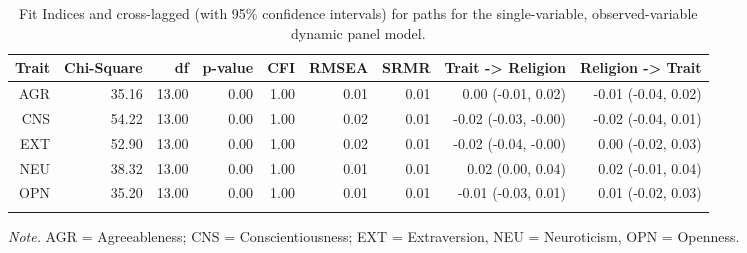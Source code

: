 \documentclass[
  man,floatsintext]{apa6}
\begin{document}
\begin{table}[h]

\begin{center}
\begin{threeparttable}

\caption{\label{tab:dpmResults}Fit Indices and cross-lagged (with 95\% confidence intervals) for paths for the single-variable, observed-variable dynamic panel model.}

\begin{tabular}{rrrrrrrrr}
\toprule
Trait & Chi-Square & df & p-value & CFI & RMSEA & SRMR & Trait -> Religion & Religion -> Trait\\
\midrule
AGR & 35.16 & 13.00 & 0.00 & 1.00 & 0.01 & 0.01 & 0.00 (-0.01, 0.02) & -0.01 (-0.04, 0.02)\\
CNS & 54.22 & 13.00 & 0.00 & 1.00 & 0.02 & 0.01 & -0.02 (-0.03, -0.00) & -0.02 (-0.04, 0.01)\\
EXT & 52.90 & 13.00 & 0.00 & 1.00 & 0.02 & 0.01 & -0.02 (-0.04, -0.00) & 0.00 (-0.02, 0.03)\\
NEU & 38.32 & 13.00 & 0.00 & 1.00 & 0.01 & 0.01 & 0.02 (0.00, 0.04) & 0.02 (-0.01, 0.04)\\
OPN & 35.20 & 13.00 & 0.00 & 1.00 & 0.01 & 0.01 & -0.01 (-0.03, 0.01) & 0.01 (-0.02, 0.03)\\
\bottomrule
\addlinespace
\end{tabular}

\begin{tablenotes}[para]
\normalsize{\textit{Note.}  AGR = Agreeableness; CNS = Conscientiousness; EXT = Extraversion, NEU = Neuroticism, OPN = Openness.}
\end{tablenotes}

\end{threeparttable}
\end{center}

\end{table}
\end{document}

